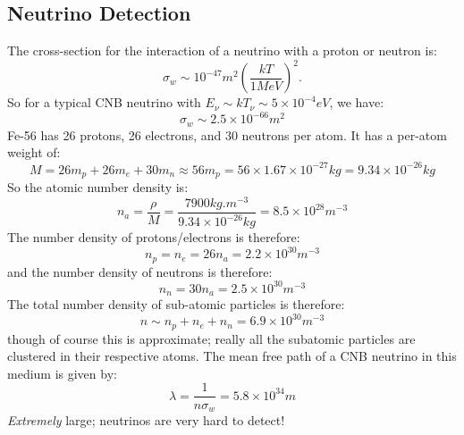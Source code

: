 \subsection{Neutrino Detection}
The cross-section for the interaction of a neutrino with a proton or neutron is:
\begin{equation}
    \sigma_w \sim 10^{-47}\si{m^2}\left(\frac{kT}{1\si{MeV}}\right)^2.
\end{equation}
So for a typical CNB neutrino with $E_\nu \sim kT_\nu \sim 5 \times 10^{-4}\si{eV}$, we have:
\begin{equation}
    \boxed{\sigma_w \sim 2.5 \times 10^{-66}\si{m^2}}
\end{equation}
Fe-56 has 26 protons, 26 electrons, and 30 neutrons per atom. It has a per-atom weight of:
\begin{equation}
    M = 26m_p + 26m_e + 30m_n \approx 56m_p = 56 \times 1.67 \times 10^{-27}\si{kg} =  9.34 \times 10^{-26}\si{kg}
\end{equation}
So the atomic number density is:
\begin{equation}
    n_a = \frac{\rho}{M} = \frac{7900\si{kg.m^{-3}}}{9.34 \times 10^{-26}\si{kg}} = 8.5 \times 10^{28}\si{m^{-3}}
\end{equation}
The number density of protons/electrons is therefore:
\begin{equation}
    \boxed{n_p = n_e = 26n_a = 2.2 \times 10^{30}\si{m^{-3}}}
\end{equation}
and the number density of neutrons is therefore:
\begin{equation}
    \boxed{n_n = 30n_a = 2.5 \times 10^{30}\si{m^{-3}}}
\end{equation}
The total number density of sub-atomic particles is therefore:
\begin{equation}
    n \sim n_p + n_e + n_n = 6.9 \times 10^{30}\si{m^{-3}}
\end{equation}
though of course this is approximate; really all the subatomic particles are clustered in their respective atoms. The mean free path of a CNB neutrino in this medium is given by:
\begin{equation}
    \boxed{\lambda = \frac{1}{n\sigma_w} = 5.8 \times 10^{34}\si{m}}
\end{equation}
\emph{Extremely} large; neutrinos are very hard to detect!

